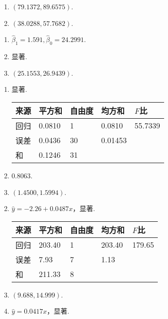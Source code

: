 \begin{answer}
\begin{enumerate}
\begin{center}
\begin{tabularx}{0.7\linewidth}{ZZZZZ}
        \bottomrule
      \end{tabularx}
      \end{center}
      \item $(79.1372,89.6575)$.
      \item $(38.0288,57.7682)$.
    \end{enumerate}
    \item \begin{enumerate}
      \item $\hat\beta_1=1.591,\hat\beta_0=24.2991$.
      \item 显著.
      \item $(25.1553,26.9439)$.
    \end{enumerate}
    \item \begin{enumerate}
      \item 显著.
      \begin{center}
      \begin{tabularx}{0.7\linewidth}{ZZZZZ}
        \toprule
        来源 & 平方和 & 自由度 & 均方和 & $F$比 \\
        \midrule
        回归 & 0.0810 & 1 & 0.0810 & 55.7339 \\
        误差 & 0.0436 & 30 & 0.01453 \\
        \midrule
        和 & 0.1246 & 31 \\
        \bottomrule
      \end{tabularx}
      \end{center}
      \item 0.8063.
      \item $(1.4500,1.5994)$.
    \end{enumerate}
    \item \begin{enumerate}
      \setcounter{enumi}{1}
      \item $\hat y=-2.26+0.0487x$，显著.
      \begin{center}
      \begin{tabularx}{0.7\linewidth}{ZZZZZ}
        \toprule
        来源 & 平方和 & 自由度 & 均方和 & $F$比 \\
        \midrule
        回归 & 203.40 & 1 & 203.40 & 179.65 \\
        误差 & 7.93 & 7 & 1.13 \\
        \midrule
        和 & 211.33 & 8 \\
        \bottomrule
      \end{tabularx}
      \end{center}
      \item $(9.688,14.999)$.
      \item $\hat y=0.0417x$，显著.
    \end{enumerate}
\end{answer}

